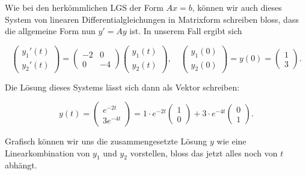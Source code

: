 Wie bei den herkömmlichen LGS der Form \( Ax = b \), können wir auch dieses System von linearen Differentialgleichungen in Matrixform schreiben bloss, dass die allgemeine Form nun \( y' = Ay \) ist. In unserem Fall ergibt sich

\begin{equation*}
    \begin{pmatrix}
        y_1'(t) \\
        y_2'(t)
    \end{pmatrix} = 
    \begin{pmatrix}
        -2 & 0 \\
        0 & -4
    \end{pmatrix}
    \begin{pmatrix}
        y_1(t) \\
        y_2(t)
    \end{pmatrix},
    \quad \begin{pmatrix}
        y_1(0) \\
        y_2(0)
    \end{pmatrix} = y(0) =
    \begin{pmatrix}
        1 \\
        3
    \end{pmatrix}.
\end{equation*}

\vspace{0.25\baselineskip}

Die Lösung dieses Systems lässt sich dann als Vektor schreiben:

\begin{equation*}
    y(t) = \begin{pmatrix}
        e^{-2t} \\
        3 e^{-4t}
    \end{pmatrix} = 
     1 \cdot e^{-2t}
    \begin{pmatrix}
        1 \\
        0
    \end{pmatrix} +
    3 \cdot e^{-4t}
    \begin{pmatrix}
        0 \\
        1
    \end{pmatrix}.
\end{equation*}

\vspace{0.25\baselineskip}

Grafisch können wir uns die zusammengesetzte Lösung \( y \) wie eine Linearkombination von \( y_1 \) und \( y_2 \) vorstellen, bloss das jetzt alles noch von \( t \) abhängt. 

